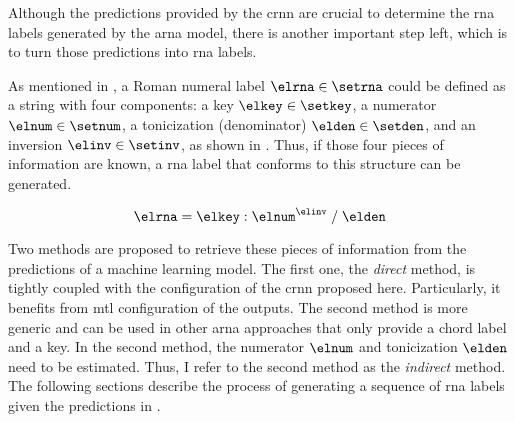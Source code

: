 
Although the predictions provided by the \gls{crnn} are
crucial to determine the \gls{rna} labels generated by the
\gls{arna} model, there is another important step left,
which is to turn those predictions into \gls{rna} labels.

As mentioned in
, a Roman
numeral label $\elrna \in \setrna$ could be defined as a
string with four components: a key $\elkey \in \setkey$, a
numerator $\elnum \in \setnum$, a tonicization (denominator)
$\elden \in \setden$, and an inversion $\elinv \in \setinv$,
as shown in . Thus, if those four pieces of
information are known, a \gls{rna} label that conforms to
this structure can be generated.

\begin{equation}
    \label{eq:rna}
    \elrna = \elkey : \elnum^{\elinv} \; / \; \elden
\end{equation}

Two methods are proposed to retrieve these pieces of
information from the predictions of a machine learning
model. The first one, the \emph{direct} method, is tightly
coupled with the configuration of the \gls{crnn} proposed
here. Particularly, it benefits from  \gls{mtl}
configuration of the outputs. The second method is more
generic and can be used in other \gls{arna} approaches that
only provide a chord label and a key. In the second method,
the numerator $\elnum$ and tonicization $\elden$ need to be
estimated. Thus, I refer to the second method as the
\emph{indirect} method. The following sections describe the
process of generating a sequence of \gls{rna} labels given
the predictions in .




